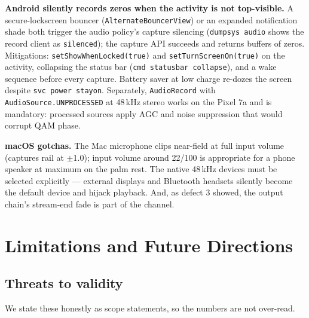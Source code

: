 \documentclass[11pt]{article}
\begin{document}
\textbf{Android silently records zeros when the activity is not top-visible.}
A secure-lockscreen bouncer (\texttt{AlternateBouncerView}) or an expanded
notification shade both trigger the audio policy's capture silencing
(\texttt{dumpsys audio} shows the record client as \texttt{silenced}); the
capture API succeeds and returns buffers of zeros. Mitigations:
\texttt{setShowWhenLocked(true)} and \texttt{setTurnScreenOn(true)} on the
activity, collapsing the status bar (\texttt{cmd statusbar collapse}), and a
wake sequence before every capture. Battery saver at low charge re-dozes the
screen despite \texttt{svc power stayon}. Separately,
\texttt{AudioRecord} with \texttt{AudioSource.UNPROCESSED} at 48\,kHz stereo
works on the Pixel 7a and is mandatory: processed sources apply AGC and noise
suppression that would corrupt QAM phase.

\textbf{macOS gotchas.} The Mac microphone clips near-field at full input
volume (captures rail at $\pm$1.0); input volume around 22/100 is appropriate
for a phone speaker at maximum on the palm rest. The native 48\,kHz devices
must be selected explicitly --- external displays and Bluetooth headsets
silently become the default device and hijack playback. And, as defect 3
showed, the output chain's stream-end fade is part of the channel.

\section{Limitations and Future Directions}
\label{sec:future}

\subsection{Threats to validity}
\label{sec:threats}

We state these honestly as scope statements, so the numbers are not over-read.
\end{document}
